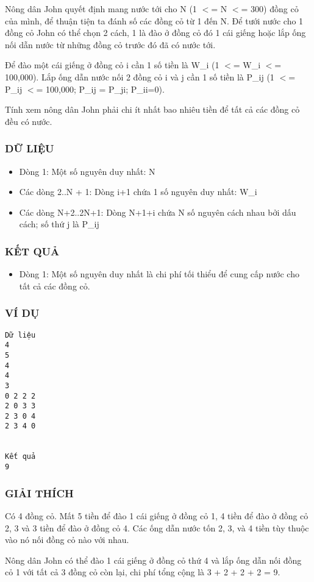 



   Nông dân John quyết định mang nước tới cho N (1 $<$= N $<$= 300) đồng cỏ của mình, để thuận tiện ta đánh số các đồng cỏ từ 1 đến N. Để tưới nước cho 1 đồng cỏ John có thể chọn 2 cách, 1 là đào ở đồng cỏ  đó 1 cái giếng hoặc lắp ống nối dẫn nước từ những đồng cỏ trước đó đã có nước tới.  

   Để đào một cái giếng ở đồng cỏ i cần 1 số tiền là W\_i (1 $<$= W\_i $<$= 100,000). Lắp ống dẫn nước nối 2 đồng cỏ i và j cần 1 số tiền là P\_ij (1 $<$= P\_ij $<$= 100,000; P\_ij = P\_ji; P\_ii=0).  

   Tính xem nông dân John phải chi ít nhất bao nhiêu tiền để tất cả các  đồng cỏ đều có nước.  

\subsubsection{   DỮ LIỆU  }
\begin{itemize}
	\item     Dòng 1: Một số nguyên duy nhất: N   
	\item     Các dòng 2..N + 1: Dòng i+1 chứa 1 số nguyên duy nhất: W\_i   
	\item     Các dòng N+2..2N+1: Dòng N+1+i chứa N số nguyên cách nhau bởi dấu cách; số thứ         j là P\_ij   
\end{itemize}

\subsubsection{   KẾT QUẢ  }
\begin{itemize}
	\item     Dòng 1: Một số nguyên duy nhất là chi phí tối thiểu         để cung cấp nước cho tất cả các đồng cỏ.   
\end{itemize}

\subsubsection{   VÍ DỤ  }
\begin{verbatim}
Dữ liệu
4
5
4
4
3
0 2 2 2
2 0 3 3
2 3 0 4
2 3 4 0


Kết quả
9
\end{verbatim}

\subsubsection{   GIẢI THÍCH  }

   Có 4 đồng cỏ. Mất 5 tiền để đào 1 cái giếng ở đồng cỏ 1, 4 tiền để đào ở đồng cỏ 2, 3 và 3 tiền để đào ở đồng cỏ 4. Các ống dẫn nước tốn 2, 3, và 4 tiền tùy thuộc vào nó nối đồng cỏ nào với nhau.  

   Nông dân John có thể đào 1 cái giếng ở đồng cỏ thứ 4 và lắp ống dẫn  nối đồng cỏ 1 với tất cả 3 đồng cỏ còn lại, chi phí tổng cộng là 3 + 2 + 2 + 2 = 9.  